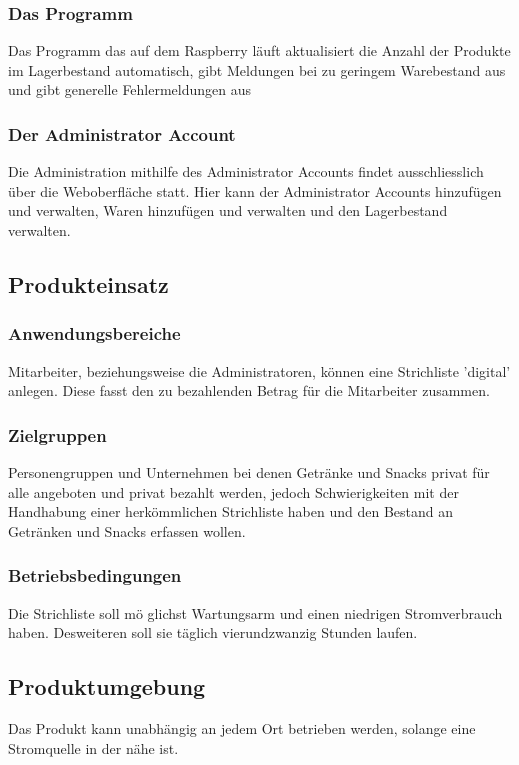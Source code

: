 \documentclass[11pt,a4paper]{article} %
\begin{document}
\subsubsection{Das Programm}
Das Programm das auf dem Raspberry l\"auft aktualisiert die Anzahl der Produkte im Lagerbestand automatisch, gibt Meldungen bei zu geringem Warebestand aus und gibt generelle Fehlermeldungen aus

\subsubsection{Der Administrator Account}
Die Administration mithilfe des Administrator Accounts findet ausschliesslich über die Weboberfl\"ache statt. Hier kann der Administrator Accounts hinzuf\"ugen und verwalten, Waren hinzuf\"ugen und verwalten und den Lagerbestand verwalten.

\subsection{Produkteinsatz}
\subsubsection{Anwendungsbereiche}
Mitarbeiter, beziehungsweise die Administratoren, k\"onnen eine Strichliste 'digital' anlegen. Diese fasst den zu bezahlenden Betrag f\"ur die Mitarbeiter zusammen.

\subsubsection{Zielgruppen}
Personengruppen und Unternehmen bei denen Getr\"anke und Snacks privat f\"ur alle angeboten und privat bezahlt werden, jedoch Schwierigkeiten mit der Handhabung einer herk\"ommlichen Strichliste haben und den Bestand an Getr\"anken und Snacks erfassen wollen.

\subsubsection{Betriebsbedingungen}
Die Strichliste soll m\"o
glichst Wartungsarm und einen niedrigen Stromverbrauch haben. Desweiteren soll sie t\"aglich vierundzwanzig Stunden laufen.

\subsection{Produktumgebung}
Das Produkt kann unabh\"angig an jedem Ort betrieben werden, solange eine Stromquelle in der n\"ahe ist.
\end{document}
